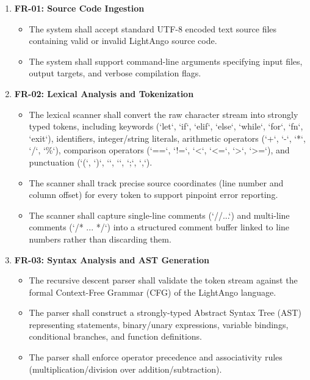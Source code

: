 \begin{enumerate}
    \item \textbf{FR-01: Source Code Ingestion}
    \begin{itemize}
        \item The system shall accept standard UTF-8 encoded text source files containing valid or invalid LightAngo source code.
        \item The system shall support command-line arguments specifying input files, output targets, and verbose compilation flags.
    \end{itemize}

    \item \textbf{FR-02: Lexical Analysis and Tokenization}
    \begin{itemize}
        \item The lexical scanner shall convert the raw character stream into strongly typed tokens, including keywords (`let`, `if`, `elif`, `else`, `while`, `for`, `fn`, `exit`), identifiers, integer/string literals, arithmetic operators (`+`, `-`, `*`, `/`, `\%`), comparison operators (`==`, `!=`, `<`, `<=`, `>`, `>=`), and punctuation (`(`, `)`, `{`, `}`, `;`, `,`).
        \item The scanner shall track precise source coordinates (line number and column offset) for every token to support pinpoint error reporting.
        \item The scanner shall capture single-line comments (`//...`) and multi-line comments (`/* ... */`) into a structured comment buffer linked to line numbers rather than discarding them.
    \end{itemize}

    \item \textbf{FR-03: Syntax Analysis and AST Generation}
    \begin{itemize}
        \item The recursive descent parser shall validate the token stream against the formal Context-Free Grammar (CFG) of the LightAngo language.
        \item The parser shall construct a strongly-typed Abstract Syntax Tree (AST) representing statements, binary/unary expressions, variable bindings, conditional branches, and function definitions.
        \item The parser shall enforce operator precedence and associativity rules (multiplication/division over addition/subtraction).
    \end{itemize}


\end{enumerate}
